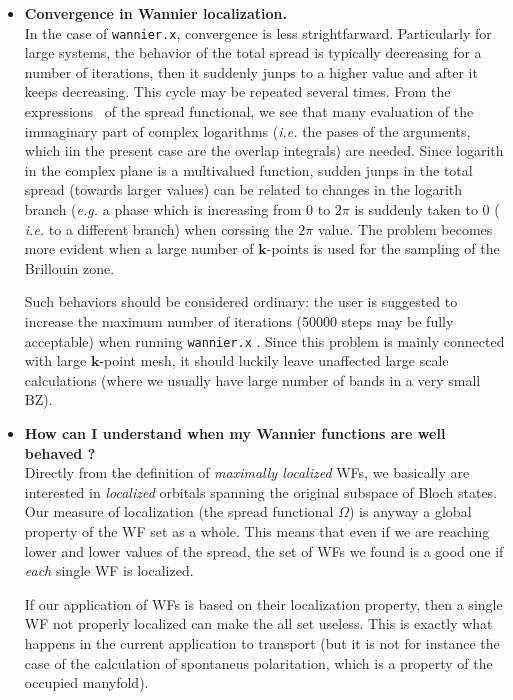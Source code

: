 \begin{itemize}
\item   {\bf Convergence in Wannier localization.} \\
        In the case of {\tt wannier.x}, convergence is less strightfarward.
        Particularly for large systems, the behavior of the total spread 
        is typically decreasing for a number of iterations, then it suddenly 
        junps to a higher value and after it keeps decreasing. This cycle may be 
        repeated several times.
        From the expressions~\cite{nicola} of the spread functional, we see that
        many evaluation of the immaginary part of complex logarithms ({\it i.e.} 
        the pases of the arguments, which iin the present case are the overlap 
        integrals) are needed. Since logarith in the complex plane
        is a multivalued function, sudden junps in the total spread (towards larger 
        values) can be related to changes in the logarith branch ({\it e.g.} a phase 
        which is increasing from $0$ to $2\pi$ is suddenly taken to 0 (
        {\it i.e.} to a different branch) when corssing the $2\pi$ value.
        The problem becomes more evident when a large number of $\mathbf{k}$-points
        is used for the sampling of the Brillouin zone.

        Such behaviors should be considered ordinary: the user is suggested to increase
        the maximum number of iterations (50000 steps may be fully acceptable) 
        when running {\tt wannier.x} . Since this problem is mainly connected with 
        large $\mathbf{k}$-point mesh, it should luckily leave unaffected large scale
        calculations (where we usually have large number of bands in a very small BZ).

\item   {\bf How can I understand when my Wannier functions are well behaved ?} \\
        Directly from the definition of {\it maximally localized} WFs, we basically
        are interested in {\it localized} orbitals spanning the original subspace
        of Bloch states. Our measure of localization (the spread functional $\Omega$) 
        is anyway a global property of the WF set as a whole. 
        This means that even if we are reaching lower and lower
        values of the spread, the set of WFs we found is a good one if {\it each} 
        single WF is localized.
        
        If our application of WFs is based on their localization property, then 
        a single WF not properly localized can make the all set useless. This is
        exactly what happens in the current application to transport (but it is not 
        for instance the case of the calculation of spontaneus polaritation, which is 
        a property of the occupied manyfold).
        

\end{itemize}
